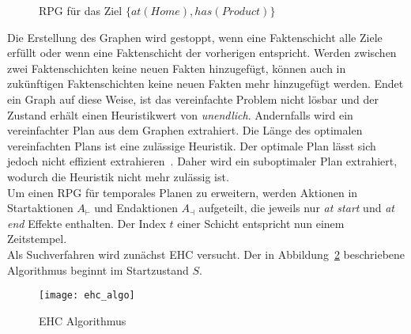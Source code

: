 \begin{figure}[ht!]
    \caption{\ac{RPG} für das Ziel $\{at(Home), has(Product)\}$}
    \label{fig:rpg}
\end{figure}
Die Erstellung des Graphen wird gestoppt, wenn eine Faktenschicht alle Ziele erfüllt oder wenn eine Faktenschicht der vorherigen entspricht.
Werden zwischen zwei Faktenschichten keine neuen Fakten hinzugefügt, können auch in zukünftigen Faktenschichten keine neuen Fakten mehr hinzugefügt werden.
Endet ein Graph auf diese Weise, ist das vereinfachte Problem nicht lösbar und der Zustand erhält einen Heuristikwert von \emph{unendlich}.
Andernfalls wird ein vereinfachter Plan aus dem Graphen extrahiert.
Die Länge des optimalen vereinfachten Plans ist eine zulässige Heuristik.
Der optimale Plan lässt sich jedoch nicht effizient extrahieren~\cite{hoffmannnebel2001}.
Daher wird ein suboptimaler Plan extrahiert, wodurch die Heuristik nicht mehr zulässig ist.\\
Um einen \ac{RPG} für temporales Planen zu erweitern, werden Aktionen in Startaktionen $A_\vdash$ und Endaktionen $A_\dashv$ aufgeteilt, die jeweils nur \emph{at start} und \emph{at end} Effekte enthalten.
Der Index $t$ einer Schicht entspricht nun einem Zeitstempel.\\
Als Suchverfahren wird zunächst \ac{EHC} versucht.
Der in Abbildung~\ref{fig:ehc_algo} beschriebene Algorithmus beginnt im Startzustand $S$.
\begin{figure}[h!]
           \centering
           \texttt{[image: ehc\_algo]}
           \caption{\ac{EHC} Algorithmus~\cite{hoffmannnebel2001}}
           \label{fig:ehc_algo}
\end{figure}
